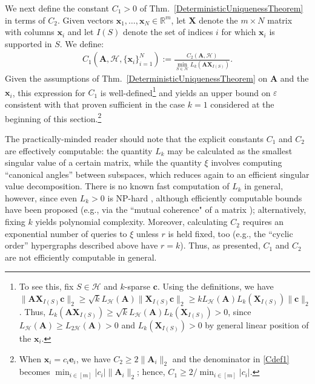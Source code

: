 \documentclass[journal, twocolumn]{IEEEtran}
\begin{document}
We next define the constant $C_1 > 0$ of Thm.~\ref{DeterministicUniquenessTheorem} in terms of $C_2$. Given vectors $\mathbf{x}_1, \ldots, \mathbf{x}_N \in \mathbb{R}^m$, let $\mathbf{X}$ denote the $m \times N$ matrix with columns $\mathbf{x}_i$ and let $I(S)$ denote the set of indices $i$ for which $\mathbf{x}_i$ is supported in $S$.  We define:
\begin{align}\label{Cdef1}
C_1(\mathbf{A}, \mathcal{H}, \{\mathbf{x}_i\}_{i=1}^N) := \frac{ C_2(\mathbf{A}, \mathcal{H}) } { \min_{S \in \mathcal{H}} L_k(\mathbf{AX}_{I(S)}) }.
\end{align}
Given the assumptions of Thm.~\ref{DeterministicUniquenessTheorem} on $\mathbf{A}$ and the $\mathbf{x}_i$, this expression for $C_1$ is well-defined\footnote{\label{note1}To see this, fix $S \in \mathcal{H}$ and $k$-sparse $\mathbf{c}$. Using the definitions, we have $\|\mathbf{AX}_{I(S)}\mathbf{c}\|_2 \geq \sqrt{k} L_\mathcal{H}(\mathbf{A})\|\mathbf{X}_{I(S)}\mathbf{c}\|_2 \geq k L_\mathcal{H}(\mathbf{A}) L_k(\mathbf{X}_{I(S)})\|\mathbf{c}\|_2$. Thus, $L_k(\mathbf{AX}_{I(S)}) \geq \sqrt{k} L_\mathcal{H}(\mathbf{A}) L_k(\mathbf{X}_{I(S)}) > 0$, since $L_{\mathcal{H}}(\mathbf{A}) \geq L_{2\mathcal{H}}(\mathbf{A})> 0$ and $L_k(\mathbf{X}_{I(S)}) > 0$ by general linear position of the $\mathbf{x}_i$.} and yields an upper bound on $\varepsilon$ consistent with that proven sufficient in the case $k=1$ considered at the beginning of this section.\footnote{When $\mathbf{x}_i = c_i\mathbf{e}_i$, we have $C_2 \geq 2\|\mathbf{A}_i\|_2$ and the denominator in \eqref{Cdef1} becomes $\min_{i \in [m]} |c_i| \|\mathbf{A}_i\|_2$; hence, $C_1 \geq 2 / \min_{i \in [m]} |c_i|$.}

The practically-minded reader should note that the explicit constants $C_1$ and $C_2$ are effectively computable: the quantity $L_k$ may be calculated as the smallest singular value of a certain matrix, while the quantity $\xi$ involves computing ``canonical angles'' between subspaces, which reduces again to an efficient singular value decomposition. 
There is no known fast computation of $L_k$ in general, however, since even $L_{k} > 0$ is NP-hard \cite{tillmann2014computational}, although 
efficiently computable bounds have been proposed (e.g., via the ``mutual coherence" of a matrix \cite{donoho2003optimally}); alternatively, 
fixing $k$ yields polynomial complexity. Moreover, calculating $C_2$ requires an exponential number of queries to $\xi$ unless $r$ is held fixed, too (e.g., the ``cyclic order'' hypergraphs described above have $r=k$).  Thus, as presented, $C_1$ and $C_2$ are not efficiently computable in general.  %
\end{document}

